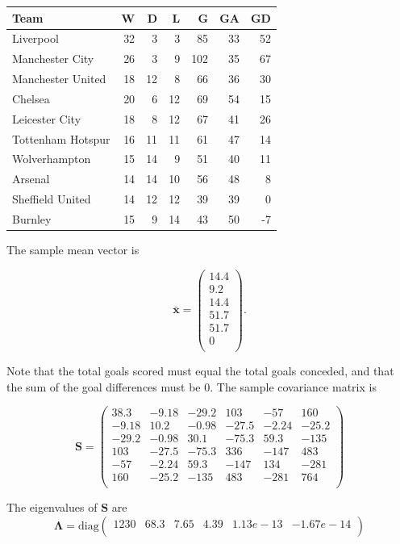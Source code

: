 \documentclass[
]{book}
\theoremstyle{definition}
\theoremstyle{definition}
\theoremstyle{definition}
\theoremstyle{definition}
\theoremstyle{remark}
\begin{document}
\begin{tabular}{lrrrrrr}
\toprule
Team & W & D & L & G & GA & GD\\
\midrule
Liverpool & 32 & 3 & 3 & 85 & 33 & 52\\
Manchester City & 26 & 3 & 9 & 102 & 35 & 67\\
Manchester United & 18 & 12 & 8 & 66 & 36 & 30\\
Chelsea & 20 & 6 & 12 & 69 & 54 & 15\\
Leicester City & 18 & 8 & 12 & 67 & 41 & 26\\
\addlinespace
Tottenham Hotspur & 16 & 11 & 11 & 61 & 47 & 14\\
Wolverhampton & 15 & 14 & 9 & 51 & 40 & 11\\
Arsenal & 14 & 14 & 10 & 56 & 48 & 8\\
Sheffield United & 14 & 12 & 12 & 39 & 39 & 0\\
Burnley & 15 & 9 & 14 & 43 & 50 & -7\\
\bottomrule
\end{tabular}

The sample mean vector is

\[\bar{\mathbf x} =\begin{pmatrix}14.4 \\9.2 \\14.4 \\51.7 \\51.7 \\0 \\\end{pmatrix}.\]

Note that the total goals scored must equal the total goals conceded, and that the sum of the goal differences must be \(0\). The sample covariance matrix is

\begin{equation}
\mathbf S= \begin{pmatrix}38.3&-9.18&-29.2&103&-57&160 \\-9.18&10.2&-0.98&-27.5&-2.24&-25.2 \\-29.2&-0.98&30.1&-75.3&59.3&-135 \\103&-27.5&-75.3&336&-147&483 \\-57&-2.24&59.3&-147&134&-281 \\160&-25.2&-135&483&-281&764 \\\end{pmatrix}
\label{eq:PLES}
\end{equation}

The eigenvalues of \(\mathbf S\) are
\[\boldsymbol \Lambda= \text{diag}\begin{pmatrix}1230&68.3&7.65&4.39&1.13e-13&-1.67e-14 \\\end{pmatrix}\]
\end{document}
